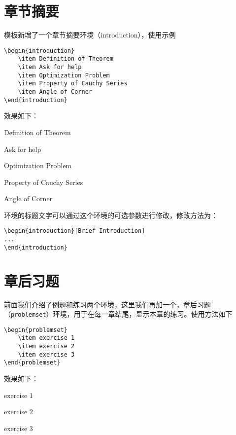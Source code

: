 \documentclass[cn,11pt]{elegantbook}
\begin{document}
\section{章节摘要}
模板新增了一个章节摘要环境（introduction），使用示例
\begin{lstlisting}
\begin{introduction}
	\item Definition of Theorem
	\item Ask for help
	\item Optimization Problem
	\item Property of Cauchy Series
	\item Angle of Corner
\end{introduction}
\end{lstlisting}
效果如下：
\begin{introduction}
	\item Definition of Theorem
	\item Ask for help
	\item Optimization Problem
	\item Property of Cauchy Series
	\item Angle of Corner
\end{introduction}

环境的标题文字可以通过这个环境的可选参数进行修改，修改方法为：
\begin{lstlisting}
\begin{introduction}[Brief Introduction]
...
\end{introduction}
\end{lstlisting}


\section{章后习题}
前面我们介绍了例题和练习两个环境，这里我们再加一个，章后习题（\lstinline{problemset}）环境，用于在每一章结尾，显示本章的练习。使用方法如下

\begin{lstlisting}
\begin{problemset}
	\item exercise 1
	\item exercise 2
	\item exercise 3
\end{problemset}
\end{lstlisting}


效果如下：
\begin{problemset}
	\item exercise 1
	\item exercise 2
	\item exercise 3
\end{problemset}
\end{document}
